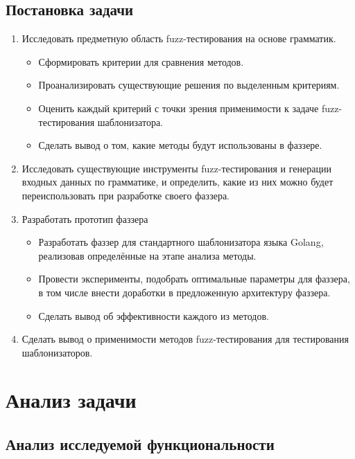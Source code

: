 \documentclass[a4paper]{article}
\begin{document}
\subsection{Постановка задачи}
\begin{enumerate}
    \item Исследовать предметную область fuzz-тестирования на основе грамматик.
        \begin{itemize}
        \item Сформировать критерии для сравнения методов.
        \item Проанализировать существующие решения по выделенным критериям.
        \item Оценить каждый критерий с точки зрения применимости к задаче fuzz-тестирования шаблонизатора.
        \item Сделать вывод о том, какие методы будут использованы в фаззере.
        \end{itemize}
    \item Исследовать существующие инструменты fuzz-тестирования и генерации входных данных по грамматике, и определить, какие из них можно будет переиспользовать при разработке своего фаззера.
    \item Разработать прототип фаззера
        \begin{itemize}
        \item Разработать фаззер для стандартного шаблонизатора языка Golang, реализовав определённые на этапе анализа методы.
        \item Провести эксперименты, подобрать оптимальные параметры для фаззера, в том числе внести доработки в предложенную архитектуру фаззера. 
        \item Сделать вывод об эффективности каждого из методов.
        \end{itemize} 
    \item Сделать вывод о применимости методов fuzz-тестирования для тестирования шаблонизаторов.
\end{enumerate}

\newpage
\section{Анализ задачи}
\indent

\subsection{Анализ исследуемой функциональности}
\end{document}
